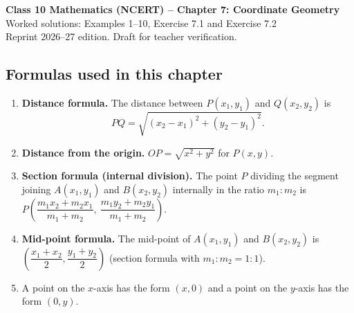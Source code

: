 \documentclass[11pt,a4paper]{article}
\let\oldsubsection\subsection
\renewcommand{\subsection}{\Needspace{12\baselineskip}\oldsubsection}
\begin{document}
\begin{center}
{\Large\bfseries Class 10 Mathematics (NCERT) -- Chapter 7: Coordinate Geometry}\\[4pt]
{\large Worked solutions: Examples 1--10, Exercise 7.1 and Exercise 7.2}\\[2pt]
{\small Reprint 2026--27 edition. Draft for teacher verification.}
\end{center}

\subsection*{Formulas used in this chapter}
\begin{enumerate}[label=(F\arabic*),leftmargin=*]
\item \textbf{Distance formula.} The distance between $P(x_1,y_1)$ and $Q(x_2,y_2)$ is
\[PQ=\sqrt{(x_2-x_1)^2+(y_2-y_1)^2}.\]
\item \textbf{Distance from the origin.} $OP=\sqrt{x^2+y^2}$ for $P(x,y)$.
\item \textbf{Section formula (internal division).} The point $P$ dividing the segment joining $A(x_1,y_1)$ and $B(x_2,y_2)$ internally in the ratio $m_1:m_2$ is
$P\left(\dfrac{m_1x_2+m_2x_1}{m_1+m_2},\ \dfrac{m_1y_2+m_2y_1}{m_1+m_2}\right)$.
\item \textbf{Mid-point formula.} The mid-point of $A(x_1,y_1)$ and $B(x_2,y_2)$ is $\left(\dfrac{x_1+x_2}{2},\dfrac{y_1+y_2}{2}\right)$ (section formula with $m_1:m_2=1:1$).
\item A point on the $x$-axis has the form $(x,0)$ and a point on the $y$-axis has the form $(0,y)$.
\end{enumerate}





\end{document}
